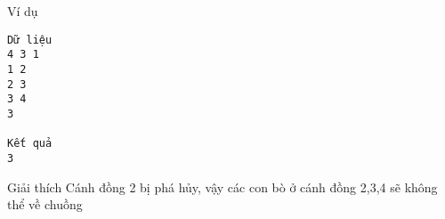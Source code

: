 Ví dụ
\begin{verbatim}
Dữ liệu
4 3 1
1 2
2 3
3 4
3

Kết quả
3
\end{verbatim}
Giải thích
Cánh đồng 2 bị phá hủy, vậy các con bò ở cánh đồng 2,3,4 sẽ không thể về chuồng